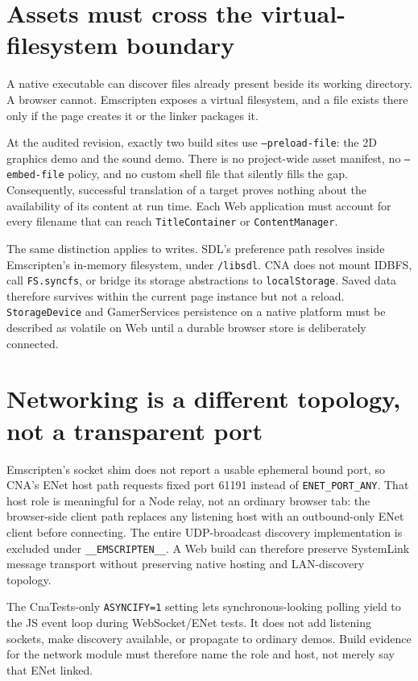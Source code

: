 \section{Assets must cross the virtual-filesystem boundary}

A native executable can discover files already present beside its working directory.  A
browser cannot.  Emscripten exposes a virtual filesystem, and a file exists there only if the
page creates it or the linker packages it.

At the audited revision, exactly two build sites use \texttt{--preload-file}: the 2D graphics
demo and the sound demo.  There is no project-wide asset manifest, no \texttt{--embed-file}
policy, and no custom shell file that silently fills the gap.  Consequently, successful
translation of a target proves nothing about the availability of its content at run time.
Each Web application must account for every filename that can reach
\texttt{TitleContainer} or \texttt{ContentManager}.

The same distinction applies to writes.  SDL's preference path resolves inside Emscripten's
in-memory filesystem, under \texttt{/libsdl}.  CNA does not mount IDBFS, call
\texttt{FS.syncfs}, or bridge its storage abstractions to \texttt{localStorage}.  Saved data
therefore survives within the current page instance but not a reload.  \texttt{StorageDevice}
and GamerServices persistence on a native platform must be described as volatile on Web until
a durable browser store is deliberately connected.

\section{Networking is a different topology, not a transparent port}

Emscripten's socket shim does not report a usable ephemeral bound port, so CNA's ENet host path
requests fixed port 61191 instead of \texttt{ENET\_PORT\_ANY}. That host role is meaningful for a
Node relay, not an ordinary browser tab: the browser-side client path replaces any listening host
with an outbound-only ENet client before connecting. The entire UDP-broadcast discovery
implementation is excluded under \texttt{\_\_EMSCRIPTEN\_\_}. A Web build can therefore preserve
SystemLink message transport without preserving native hosting and LAN-discovery topology.

The CnaTests-only \texttt{ASYNCIFY=1} setting lets synchronous-looking polling yield to the JS
event loop during WebSocket/ENet tests. It does not add listening sockets, make discovery
available, or propagate to ordinary demos. Build evidence for the network module must therefore
name the role and host, not merely say that ENet linked.

